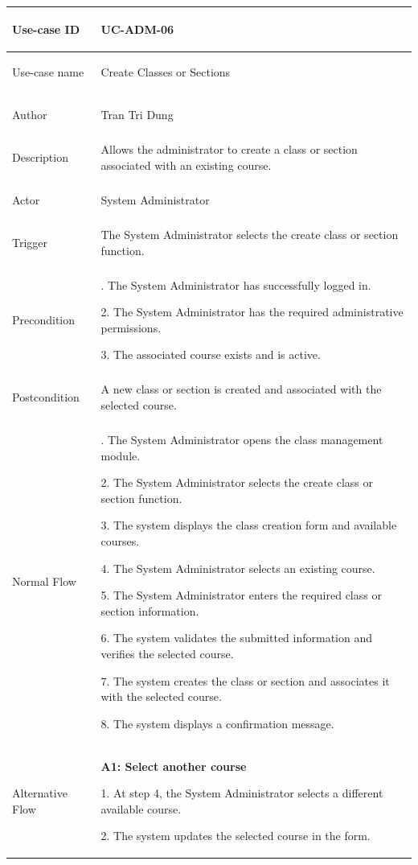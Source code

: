 \begin{longtable}{|>{\bfseries\raggedright\arraybackslash}p{}|>{\raggedright\arraybackslash}p{}|}
\hline
Use-case ID & UC-ADM-06 \\ \hline
Use-case name & Create Classes or Sections \\ \hline
Author & Tran Tri Dung \\ \hline
Description & Allows the administrator to create a class or section associated with an existing course. \\ \hline
Actor & System Administrator \\ \hline
Trigger & The System Administrator selects the create class or section function. \\ \hline
Precondition &
1. The System Administrator has successfully logged in. \par
2. The System Administrator has the required administrative permissions. \par
3. The associated course exists and is active. \\ \hline
Postcondition & A new class or section is created and associated with the selected course. \\ \hline
Normal Flow &
1. The System Administrator opens the class management module. \par
2. The System Administrator selects the create class or section function. \par
3. The system displays the class creation form and available courses. \par
4. The System Administrator selects an existing course. \par
5. The System Administrator enters the required class or section information. \par
6. The system validates the submitted information and verifies the selected course. \par
7. The system creates the class or section and associates it with the selected course. \par
8. The system displays a confirmation message. \\ \hline
Alternative Flow &
\textbf{A1: Select another course} \par
1. At step 4, the System Administrator selects a different available course. \par
2. The system updates the selected course in the form. \par

\end{longtable}
